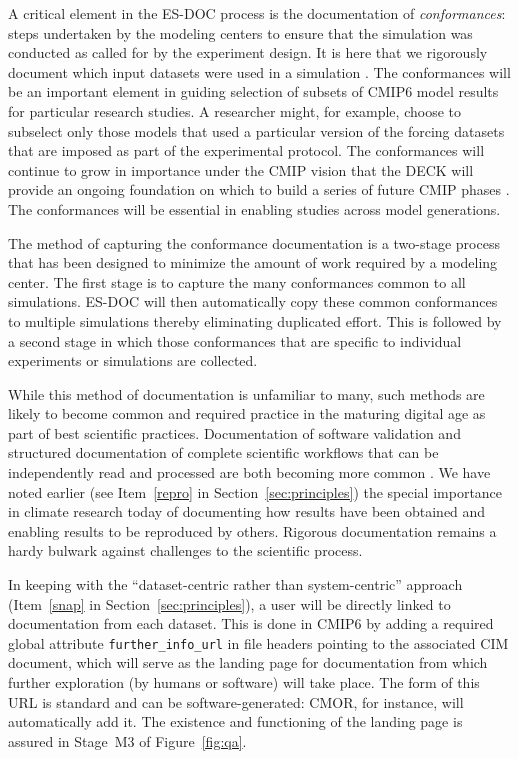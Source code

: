 \documentclass[gmd,manuscript]{copernicus}
\newcommand{\pllabel}[1]{\label{p-#1}\linelabel{l-#1}}
\begin{document}
A critical element in the ES-DOC process is the documentation of
\emph{conformances}: steps undertaken by the modeling centers to
ensure that the simulation was conducted as called for by the
experiment design. It is here that we rigorously document which input
datasets were used in a simulation \citep[e.g., the version of each of
the forcing datasets, see][]{ref:duracketal2017}. The conformances
will be an important element in guiding selection of subsets of CMIP6
model results for particular research studies. A researcher might, for
example, choose to subselect only those models that used a particular
version of the forcing datasets that are imposed as part of the
experimental protocol. The conformances will continue to grow in
importance under the CMIP vision that the DECK will provide an ongoing
foundation on which to build a series of future CMIP phases
\citep[shown schematically in Figure~1 of][]{ref:eyringetal2016a}. The
conformances will be essential in enabling studies across model
generations.

The method of capturing the conformance documentation is a two-stage
process that has been designed to minimize the amount of work required
by a modeling center. The first stage is to capture the many
conformances common to all simulations. ES-DOC will then automatically
copy these common conformances to multiple simulations thereby
eliminating duplicated effort. This is followed by a second stage in
which those conformances that are specific to individual experiments
or simulations are collected.

While this method of documentation is unfamiliar to many, such methods
are likely to become common and required practice in the maturing
digital age as part of best scientific practices. Documentation of
software validation \citep[see e.g][]{ref:peng2011} and structured
documentation of complete scientific workflows that can be
independently read and processed are both becoming more common
\citep[see the special issue on the ``Geoscience Paper of the
Future'', ][]{ref:davidetal2016}. We have noted earlier
\pllabel{RC2-32}
(see Item~\ref{repro} in Section~\ref{sec:principles}) the special
importance in climate research today of documenting how results have
been obtained and enabling results to be reproduced by others.
Rigorous documentation remains a hardy bulwark against challenges to
the scientific process.

In keeping with the ``dataset-centric rather than system-centric''
approach (Item~\ref{snap} in Section~\ref{sec:principles}), a user
will be directly linked to documentation from each dataset. This is
done in CMIP6 by
\pllabel{RC1-55}
adding a required global attribute \texttt{further\_info\_url} in file
headers pointing to the associated CIM document, which will serve as
the landing page for documentation from which further exploration (by
humans or software) will take place. The form of this URL is standard
and can be software-generated: CMOR, for instance, will automatically
add it. The existence and functioning of the landing page is assured
in Stage~M3 of Figure~\ref{fig:qa}.
\end{document}
